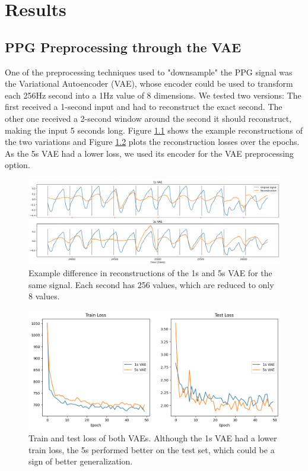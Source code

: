 \chapter{Results \label{Chapter-Results}}

\section{PPG Preprocessing through the VAE}

One of the preprocessing techniques used to "downsample" the PPG signal was the Variational Autoencoder (VAE), whose encoder could be used to transform each 256Hz second into a 1Hz value of 8 dimensions. We tested two versions: The first received a 1-second input and had to reconstruct the exact second. The other one received a 2-second window around the second it should reconstruct, making the input 5 seconds long. Figure \ref{fig:vaereconstruction} shows the example reconstructions of the two variations and Figure \ref{fig:vaeloss} plots the reconstruction losses over the epochs. As the 5s VAE had a lower loss, we used its encoder for the VAE preprocessing option.

\begin{figure}[h]
    \centering
    \includegraphics[width=\textwidth]{images/VaeReconstruction}
    \caption{Example difference in reconstructions of the 1s and 5s VAE for the same signal. Each second has 256 values, which are reduced to only 8 values.}
    \label{fig:vaereconstruction}
\end{figure}

\begin{figure}
    \centering
    \includegraphics[width=\textwidth]{images/VaeLoss}
    \caption{Train and test loss of both VAEs. Although the 1s VAE had a lower train loss, the 5s performed better on the test set, which could be a sign of better generalization.}
    \label{fig:vaeloss}
\end{figure}

